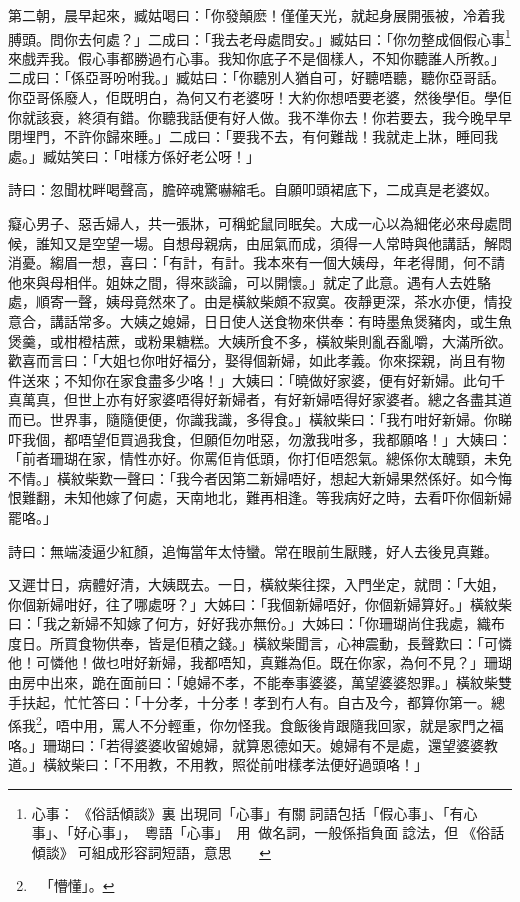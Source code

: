 \documentclass[a5paper, 12pt, openany]{book} %
\begin{document}
	第二朝，晨早起來，臧姑喝曰：「你發顛麽！僅僅天光，就起身展開張被，冷着我膊頭。問你去何處？」二成曰：「我去老母處問安。」臧姑曰：「你勿整成個假心事\footnote{心事：󱪙《俗話傾談》裏󰊺出現同「心事」有關󱝚詞語包括「假心事」、「有心事」、「好心事」，󱛖󱀱粵語「心事」用󰹚做名詞，一般係指負面󱝚諗法，但󱪙《俗話傾談》󱀥可組成形容詞短語，意思𠄡一定負面。}來戲弄我。假心事都勝過冇心事。我知你底子不是個樣人，不知你聽誰人所教。」二成曰：「係亞哥吩咐我。」臧姑曰：「你聽別人猶自可，好聽唔聽，聽你亞哥話。你亞哥係廢人，佢既明白，為何又冇老婆呀！大約你想唔要老婆，然後學佢。學佢你就該衰，終須有錯。你聽我話便有好人做。我不準你去！你若要去，我今晚早早閉埋門，不許你歸來睡。」二成曰：「要我不去，有何難哉！我就走上牀，睡囘我處。」臧姑笑曰：「咁樣方係好老公呀！」

	詩曰：忽聞枕畔喝聲高，膽碎魂驚嚇縮毛。自願叩頭裙底下，二成真是老婆奴。

	癡心男子、惡舌婦人，共一張牀，可稱蛇鼠同眠矣。大成一心以為細佬必來母處問候，誰知又是空望一場。自想母親病，由屈氣而成，須得一人常時與他講話，解悶消憂。縐眉一想，喜曰：「有計，有計。我本來有一個大姨母，年老得閒，何不請他來與母相伴。姐妹之間，得來談論，可以開懷。」就定了此意。遇有人去姓駱處，順寄一聲，姨母竟然來了。由是橫紋柴頗不寂寞。夜靜更深，茶水亦便，情投意合，講話常多。大姨之媳婦，日日使人送食物來供奉：有時墨魚煲豬肉，或生魚煲羹，或柑橙桔蔗，或粉果糖糕。大姨所食不多，橫紋柴則亂吞亂嚼，大滿所欲。歡喜而言曰：「大姐乜你咁好福分，娶得個新婦，如此孝義。你來探親，尚且有物件送來；不知你在家食盡多少咯！」大姨曰：「曉做好家婆，便有好新婦。此句千真萬真，但世上亦有好家婆唔得好新婦者，有好新婦唔得好家婆者。總之各盡其道而已。世界事，隨隨便便，你識我識，多得食。」橫紋柴曰：「我冇咁好新婦。你睇吓我個，都唔望佢買過我食，但願佢勿咁惡，勿激我咁多，我都願咯！」大姨曰：「前者珊瑚在家，情性亦好。你罵佢肯低頭，你打佢唔怨氣。總係你太醜頸，未免不情。」橫紋柴歎一聲曰：「我今者因第二新婦唔好，想起大新婦果然係好。如今悔恨難翻，未知他嫁了何處，天南地北，難再相逢。等我病好之時，去看吓你個新婦罷咯。」

	詩曰：無端淩逼少紅顏，追悔當年太恃蠻。常在眼前生厭賤，好人去後見真難。

	又遲廿日，病體好清，大姨既去。一日，橫紋柴往探，入門坐定，就問：「大姐，你個新婦咁好，往了哪處呀？」大姊曰：「我個新婦唔好，你個新婦算好。」橫紋柴曰：「我之新婦不知嫁了何方，好好我亦無份。」大姊曰：「你珊瑚尚住我處，織布度日。所買食物供奉，皆是佢積之錢。」橫紋柴聞言，心神震動，長聲歎曰：「可憐他！可憐他！做乜咁好新婦，我都唔知，真難為佢。既在你家，為何不見？」珊瑚由房中出來，跪在面前曰：「媳婦不孝，不能奉事婆婆，萬望婆婆恕罪。」橫紋柴雙手扶起，忙忙答曰：「十分孝，十分孝！孝到冇人有。自古及今，都算你第一。總係我\footnote{「懵懂」。}，唔中用，罵人不分輕重，你勿怪我。食飯後肯跟隨我回家，就是家門之福咯。」珊瑚曰：「若得婆婆收留媳婦，就算恩德如天。媳婦有不是處，還望婆婆教道。」橫紋柴曰：「不用教，不用教，照從前咁樣孝法便好過頭咯！」
\end{document}
